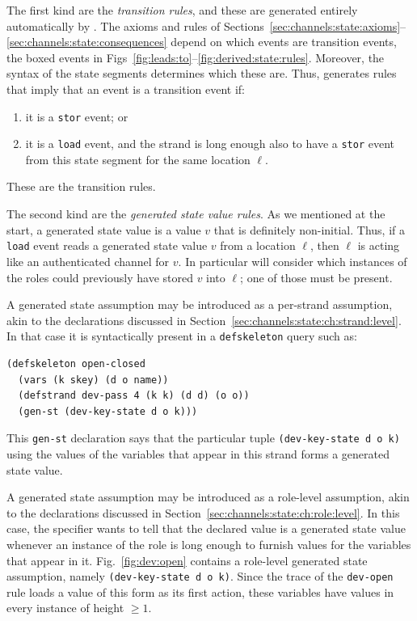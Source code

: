 The first kind are the \emph{transition rules}, and these are
generated entirely automatically by {\cpsa}.  The axioms and rules of
Sections~\ref{sec:channels:state:axioms}--\ref{sec:channels:state:consequences}
depend on which events are transition events, the boxed events in
Figs~\ref{fig:leads:to}--\ref{fig:derived:state:rules}.  Moreover, the
syntax of the state segments determines which these are.  Thus,
{\cpsa} generates rules that imply that an event is a transition event
if:
%
\begin{enumerate}
  \item it is a \verb|stor| event; or
  \item it is a \verb|load| event, and the strand is long enough also
  to have a \verb|stor| event from this state segment for the same
  location $\ell$.
\end{enumerate}
%
These are the transition rules.

The second kind are the \emph{generated state value rules}.  As we
mentioned at the start, a generated state value is a value $v$ that is
definitely non-initial.  Thus, if a \verb|load| event reads a
generated state value $v$ from a location $\ell$, then $\ell$ is
acting like an authenticated channel for $v$.  In particular {\cpsa}
will consider which instances of the roles could previously have
stored $v$ into $\ell$; one of those must be present.

A generated state assumption may be introduced as a per-strand
assumption, akin to the declarations discussed in
Section~\ref{sec:channels:state:ch:strand:level}.  In that case it is
syntactically present in a {\cpsa} \texttt{defskeleton} query such as:
%
{\small
\begin{verbatim}(defskeleton open-closed
  (vars (k skey) (d o name))
  (defstrand dev-pass 4 (k k) (d d) (o o))
  (gen-st (dev-key-state d o k)))
\end{verbatim}}
%
This \texttt{gen-st} declaration says that the particular tuple
\texttt{(dev-key-state d o k)} using the values of the variables that
appear in this strand forms a generated state value.

A generated state assumption may be introduced as a role-level
assumption, akin to the declarations discussed in
Section~\ref{sec:channels:state:ch:role:level}.  In this case, the
specifier wants to tell {\cpsa} that the declared value is a generated
state value whenever an instance of the role is long enough to furnish
values for the variables that appear in it.  Fig.~\ref{fig:dev:open}
contains a role-level generated state assumption, namely
\texttt{(dev-key-state d o k)}.  Since the trace of the
\texttt{dev-open} rule loads a value of this form as its first action,
these variables have values in every instance of height $\ge 1$.

